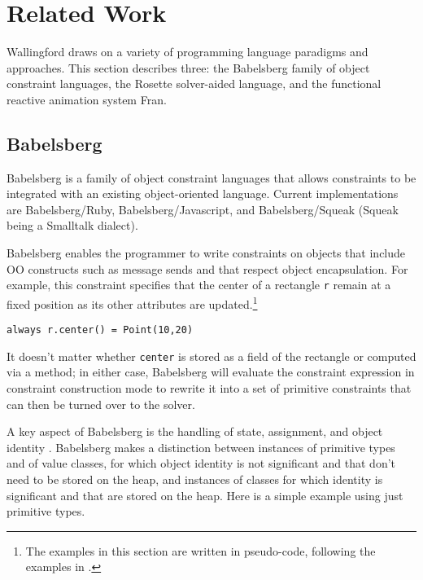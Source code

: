 \documentclass{sig-alternate-05-2015}
\begin{document}
\section{Related Work}
\label{sec:related-work}

Wallingford draws on a variety of programming language paradigms and
approaches.  This section describes three: the Babelsberg family of
object constraint languages, the Rosette solver-aided language, and
the functional reactive animation system Fran.

\subsection{Babelsberg}
\label{sec:babelsberg}

Babelsberg \cite{FelgentreffJOT14,felgentreff-oopsla-2015} is a family of
object constraint languages that allows constraints to be integrated with
an existing object-oriented language.  Current
implementations are Babelsberg/Ruby, Babelsberg/Javascript, and
Babelsberg/Squeak (Squeak being a Smalltalk dialect).

Babelsberg enables the programmer to write constraints on objects that
include OO constructs such as message sends and that respect object
encapsulation.  For example, this constraint specifies that the center
of a rectangle \verb|r| remain at a fixed position as its other
attributes are updated.\footnote{The examples in this section are
  written in pseudo-code, following the examples in 
  \cite{felgentreff-step-by-step-tr}.}

\begin{verbatim}
always r.center() = Point(10,20)
\end{verbatim}

It doesn't matter whether \verb|center| is stored as a field of the
rectangle or computed via a method; in either case, Babelsberg will
evaluate the constraint expression in constraint construction mode to
rewrite it into a set of primitive constraints that can then be turned over
to the solver.

A key aspect of Babelsberg is the handling of state, assignment, and object
identity \cite{felgentreff-oopsla-2015}.  Babelsberg makes a distinction
between instances of primitive types and of value classes, for which object
identity is not significant and that don't need to be stored on the heap,
and instances of classes for which identity is significant and that are
stored on the heap.  Here is a simple example using just primitive types.
\end{document}
